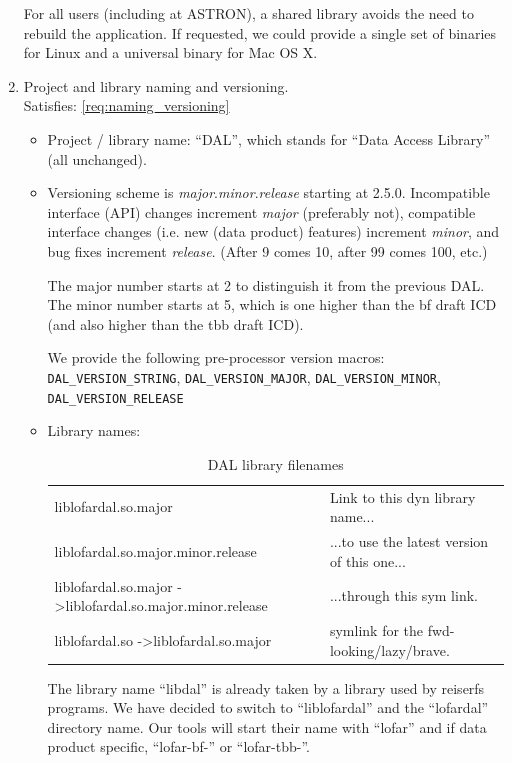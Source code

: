 \documentclass[a4paper,11pt]{article}
\begin{document}
\begin{enumerate}[resume, label=\it D.\arabic{*}]
For all users (including at ASTRON), a shared library avoids the need to rebuild the application.
If requested, we could provide a single set of binaries for Linux and a universal binary for Mac OS X.


\item \label{dsg:naming_versioning} Project and library naming and versioning.\\
Satisfies: \ref{req:naming_versioning}\\

\begin{itemize}
\itemsep0em
\item Project / library name: ``DAL'', which stands for ``Data Access Library'' (all unchanged).
\item Versioning scheme is \textit{major}.\textit{minor}.\textit{release} starting at 2.5.0.
Incompatible interface (API) changes increment \textit{major} (preferably not), compatible interface changes (i.e. new (data product) features) increment \textit{minor}, and bug fixes increment \textit{release}. (After 9 comes 10, after 99 comes 100, etc.)

The major number starts at 2 to distinguish it from the previous DAL.
The minor number starts at 5, which is one higher than the bf draft ICD (and also higher than the tbb draft ICD).

We provide the following pre-processor version macros: \texttt{DAL\_VERSION\_STRING}, \texttt{DAL\_VERSION\_MAJOR}, \texttt{DAL\_VERSION\_MINOR}, \texttt{DAL\_VERSION\_RELEASE}
\item Library names:

\begin{table}[htb!]
\label{tab:lib_names}
\centering
\begin{tabular}{ll}
liblofardal.so.major				& Link to this dyn library name...\\
liblofardal.so.major.minor.release	& ...to use the latest version of this one...\\
liblofardal.so.major -\textgreater liblofardal.so.major.minor.release	& ...through this sym link.\\
liblofardal.so -\textgreater liblofardal.so.major	& symlink for the fwd-looking/lazy/brave.\\
\end{tabular}
\caption{DAL library filenames}
\end{table}

The library name ``libdal'' is already taken by a library used by reiserfs programs.
We have decided to switch to ``liblofardal'' and the ``lofardal'' directory name.
Our tools will start their name with ``lofar'' and if data product specific, ``lofar-bf-'' or ``lofar-tbb-''.

\end{itemize}

\end{enumerate}
\end{document}

